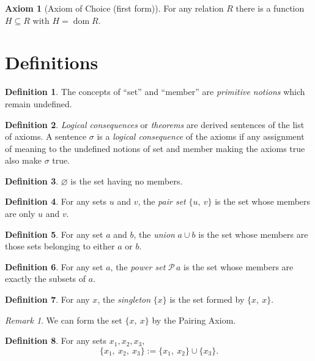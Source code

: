 \documentclass[12pt]{article}
\theoremstyle{plain}
\theoremstyle{remark}
\theoremstyle{definition}
\newtheorem{axiom}{Axiom}[section]
\newtheorem{defn}{Definition}[section]
\theoremstyle{remark}
\newtheorem*{remark}{Remark}
\newcommand{\powerset}{\mathscr{P}\,}
\DeclareMathOperator{\dom}{dom}
\begin{document}
\begin{axiom}[Axiom of Choice (first form)]
  For any relation $R$ there is a function $H \subseteq R$ with $H = \dom{R}$.
\end{axiom}

\section{Definitions}
\begin{defn}
  The concepts of ``set'' and ``member'' are \textit{primitive notions} which remain undefined.
\end{defn}

\begin{defn}
  \textit{Logical consequences} or \textit{theorems} are derived sentences of the list of axioms. A sentence $\sigma$ is a \textit{logical consequence} of the axioms if any assignment of meaning to the undefined notions of set and member making the axioms true also make $\sigma$ true.
\end{defn}

\begin{defn}\label{emptyset}
  $\varnothing$ is the set having no members.
\end{defn}

\begin{defn}
  For any sets $u$ and $v$, the \textit{pair set} $\{u,\ v\}$ is the set whose members are only $u$ and $v$.
\end{defn}

\begin{defn}
  For any set $a$ and $b$, the \textit{union} $a \cup b$ is the set whose members are those sets belonging to either $a$ or $b$.
\end{defn}

\begin{defn}
  For any set $a$, the \textit{power set} $\powerset a$ is the set whose members are exactly the subsets of $a$.
\end{defn}

\begin{defn}
  For any $x$, the \textit{singleton} $\{x\}$ is the set formed by $\{x,\ x\}$.
  \begin{remark}
    We can form the set $\{x,\ x\}$ by the Pairing Axiom.
  \end{remark}
\end{defn}

\begin{defn}
  For any sets $x_1, x_2, x_3$,
  \[
    \{x_1,\ x_2,\ x_3\} := \{x_1,\ x_2\} \cup \{x_3\}.
  \]
\end{defn}
\end{document}
